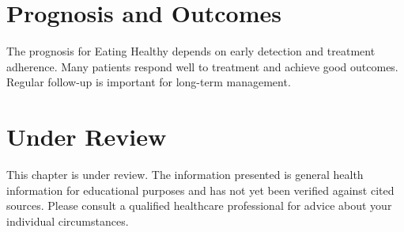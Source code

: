 \section*{Prognosis and Outcomes}
The prognosis for Eating Healthy depends on early detection and treatment adherence. Many patients respond well to treatment and achieve good outcomes. Regular follow-up is important for long-term management.
\section*{Under Review}
This chapter is under review. The information presented is general health information for educational purposes and has not yet been verified against cited sources. Please consult a qualified healthcare professional for advice about your individual circumstances.


\clearpage
